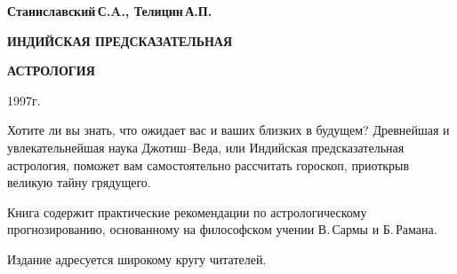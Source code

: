 \begin{titlepage}

\begin{center}
	\textbf{Станиславский\,С.A., Телицин\,А.П.}

	\vspace{18em}

	\textbf{\Large{ИНДИЙСКАЯ ПРЕДСКАЗАТЕЛЬНАЯ}}

	\vspace{1em}

	\textbf{\Large{АСТРОЛОГИЯ}}

	\vspace{20em}
\end{center}

\vspace{\fill}
\begin{center}
	1997г.
\end{center}
\end{titlepage}

\newpage

Хотите ли вы знать, что ожидает вас и ваших близких в будущем? Древнейшая и увлекательнейшая наука Джотиш--Веда, или Индийская предсказательная астрология, поможет вам самостоятельно рассчитать гороскоп, приоткрыв великую тайну грядущего.

Книга содержит практические рекомендации по астрологическому прогнозированию, основанному на философском учении В.\,Сармы и Б.\,Рамана.

Издание адресуется широкому кругу читателей.


